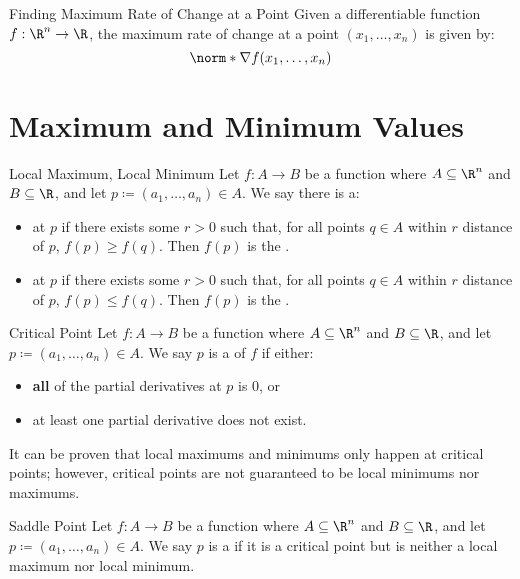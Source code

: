 \begin{tecbox}{Finding Maximum Rate of Change at a Point}{}
    Given a differentiable function $f : \R^n \to \R$, the maximum rate of change at a point $(x_1, \ldots, x_n)$ is given by:
    \[ \norm*{\nabla f(x_1, \ldots, x_n)} \]
\end{tecbox}

\section{Maximum and Minimum Values}

\begin{dfnbox}{Local Maximum, Local Minimum}{}
    Let $f : A \to B$ be a function where $A \subseteq \R^n$ and $B \subseteq \R$, and let $p \coloneq (a_1, \ldots, a_n) \in A$. We say there is a:
    \begin{itemize}
        \item {} at $p$ if there exists some $r > 0$ such that, for all points $q \in A$ within $r$ distance of $p$, $f(p) \geq f(q)$. Then $f(p)$ is the .
        \item {} at $p$ if there exists some $r > 0$ such that, for all points $q \in A$ within $r$ distance of $p$, $f(p) \leq f(q)$. Then $f(p)$ is the .
    \end{itemize}
\end{dfnbox}

\begin{dfnbox}{Critical Point}{}
    Let $f : A \to B$ be a function where $A \subseteq \R^n$ and $B \subseteq \R$, and let $p \coloneq (a_1, \ldots, a_n) \in A$. We say $p$ is a  of $f$ if  either:
    \begin{itemize}
        \item \textbf{all} of the partial derivatives at $p$ is 0, or
        \item at least one partial derivative does not exist.
    \end{itemize}
\end{dfnbox}

It can be proven that local maximums and minimums only happen at critical points; however, critical points are not guaranteed to be local minimums nor maximums.

\begin{dfnbox}{Saddle Point}{}
    Let $f : A \to B$ be a function where $A \subseteq \R^n$ and $B \subseteq \R$, and let $p \coloneq (a_1, \ldots, a_n) \in A$. We say $p$ is a  if it is a critical point but is neither a local maximum nor local minimum.
\end{dfnbox}

